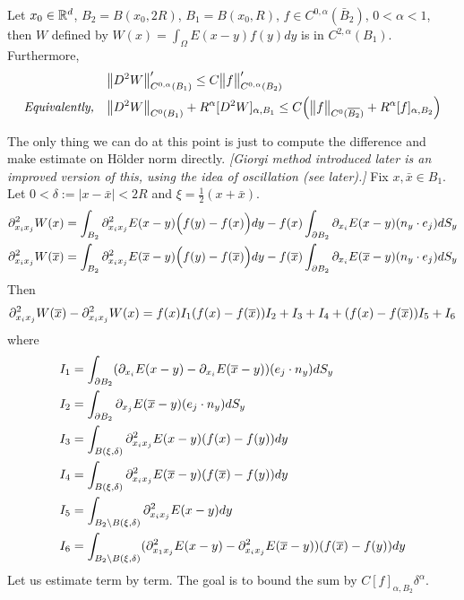 \documentclass[12pt,a4paper]{article}
\newenvironment{proof}
{\begin{changemargin}{0.5cm}{0.5cm} 
	}%
	{\end{changemargin}
}
\newenvironment{p}
{\begin{proof} 
	}%
	{\end{proof}
}
\begin{document}
 Let $x_0\in \mathbb{R}^d$, $B_2 = B(x_0, 2R)$, $B_1=B(x_0, R)$, $f\in C^{0, \alpha}(\bar{B}_2)$, $0<\alpha<1$, then $W$ defined by $W(x) = \int_{\Omega} E(x-y) f(y)dy$ is in $C^{2,\alpha}(B_1)$. Furthermore,
\begin{align*}
&\bigl\lVert D^2 W\bigr\rVert_{C^{0, \alpha}(B_1)}' \leq C \bigl\lVert f\bigr\rVert_{C^{0, \alpha}(B_2)}' \\
\textit{Equivalently,} \quad &\bigl\lVert D^2 W\bigr\rVert_{C^0(B_1)} +R^{\alpha}[D^2 W]_{\alpha, B_1} \leq C \Big( \bigl\lVert f\bigr\rVert_{C^0(\overline{B_2})} + R^{\alpha}[f]_{\alpha, B_2} \Big)
\end{align*}
\begin{p}
\pf The only thing we can do at this point is just to compute the difference and make estimate on H\"older norm directly. \emph{[Giorgi method introduced later is an improved version of this, using the idea of oscillation (see later).]}
Fix $x, \bar{x} \in B_1$. Let $0<\delta := |x-\bar{x}|< 2R$ and $\xi = \frac{1}{2}(x+\bar{x})$.
\begin{align*}
&\partial^2_{x_i x_j} W(x) = \int_{B_2} \partial_{x_i x_j}^2 E(x-y) \Big(f(y)- f(x)\Big) dy - f(x) \int_{\partial B_2} \partial_{x_i} E(x-y) (n_y \cdot e_j) dS_y \\
&\partial_{x_i x_j}^2 W(\overline{x}) = \int_{B_2} \partial_{x_i x_j}^2 E(\overline{x}-y) \Big(f(y)- f(\overline{x})\Big) dy - f(\overline{x}) \int_{\partial B_2} \partial_{x_i} E(\overline{x}-y) (n_y \cdot e_j) dS_y
\end{align*}
Then
\begin{align*}
\partial_{x_i x_j}^2 W(\overline{x}) - \partial_{x_i x_j}^2 W(x) = f(x)I_1 (f(x)- f(\overline{x}))I_2 + I_3 + I_4 + (f(x)-f(\overline{x}))I_5 + I_6 
\end{align*}
where
\begin{align*}
&I_1 = \int_{\partial B_2} (\partial_{x_i} E(x-y) - \partial_{x_i}E(\overline{x}-y))(e_j \cdot n_y) dS_y \\
&I_2 = \int_{\partial B_2} \partial_{x_j} E(\overline{x} -y) (e_j \cdot n_y) dS_y \\
&I_3 = \int_{B(\xi, \delta)} \partial^2_{x_i x_j} E(x-y) (f(x)-f(y)) dy \\
&I_4 = \int_{B(\xi, \delta)} \partial_{x_i x_j}^2 E(\overline{x}-y) (f(\overline{x}) - f(y))dy \\
&I_5 = \int_{B_2 \backslash B(\xi, \delta)} \partial_{x_i x_j}^2 E(x-y) dy \\
&I_6 = \int_{B_2 \backslash B(\xi, \delta)} (\partial_{x_1 x_j}^2 E(x-y) - \partial^2_{x_i x_j}E(\overline{x}-y) ) (f(\overline{x}) - f(y))dy
\end{align*}
Let us estimate term by term. The goal is to bound the sum by $C [f]_{\alpha, B_2}\delta^{\alpha}$.

\end{p}
\end{document}
